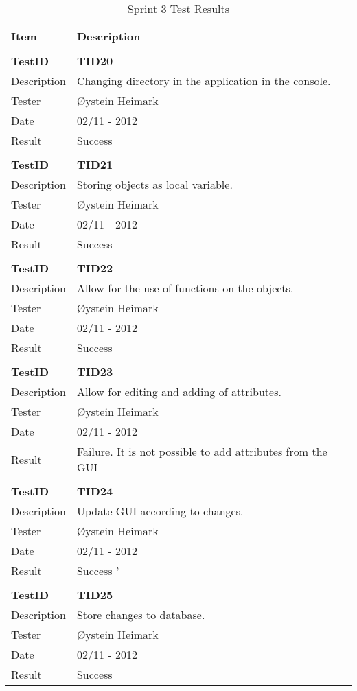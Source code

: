 \begin{table}
\caption{Sprint 3 Test Results}
\centering
\begin{tabular}{ l p{13cm} }

\hline 
Item			&Description		\\
\hline \\ [-2.0ex]

\bf{TestID}		&\bf{TID20}			\\
Description	&Changing directory in the application in the console.	\\
Tester		&Øystein Heimark	\\
Date			&02/11 - 2012	\\
Result		&Success				\\
\hline \\ [-2.0ex]

\bf{TestID}		&\bf{TID21}			\\
Description	&Storing objects as local variable.  	\\
Tester		&Øystein Heimark	\\
Date			&02/11 - 2012	\\
Result		&Success			\\
\hline \\ [-2.0ex]

\bf{TestID}		&\bf{TID22}			\\
Description	&Allow for the use of functions on the objects.	\\
Tester		&Øystein Heimark	\\
Date			&02/11 - 2012	\\
Result		&Success			\\
\hline \\ [-2.0ex]

\bf{TestID}		&\bf{TID23}			\\
Description	&Allow for editing and adding of attributes.	\\
Tester		&Øystein Heimark	\\
Date			&02/11 - 2012	\\
Result		&Failure. It is not possible to add attributes from the GUI			\\
\hline \\ [-2.0ex]

\bf{TestID}		&\bf{TID24}			\\
Description	&Update GUI according to changes.	\\
Tester		&Øystein Heimark	\\
Date			&02/11 - 2012	\\
Result		&Success		'	\\
\hline \\ [-2.0ex]

\bf{TestID}		&\bf{TID25}			\\
Description	&Store changes to database.\\
Tester		&Øystein Heimark	\\
Date			&02/11 - 2012	\\
Result		&Success			\\
\hline

\end{tabular}
\label{table:sp3testresults}
\end{table}


